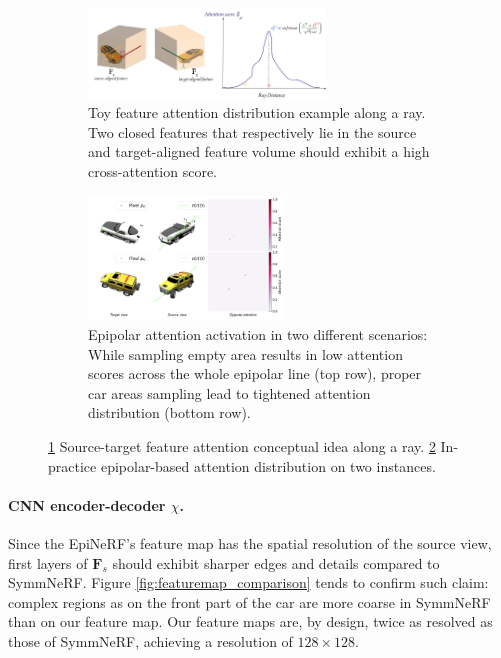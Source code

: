 \begin{figure}[htb!]
  \centering
  \begin{subfigure}[t]{0.48\linewidth}
    \includegraphics[height=2.4cm]{images/epinerf/attention_illustration.png}
    \caption{Toy feature attention distribution example along a ray. Two closed features that respectively lie in the source and target-aligned feature volume should exhibit a high cross-attention score.}
    \label{fig:attention-illustration}
  \end{subfigure}
  \hfill
  \begin{subfigure}[t]{0.48\linewidth}
    \center
    \includegraphics[height=3.3cm]{images/epinerf/exp_epipolar_attention.png}
    \caption{Epipolar attention activation in two different scenarios: While sampling empty area results in low attention scores across the whole epipolar line (top row), proper car areas sampling lead to tightened attention distribution (bottom row).}
    \label{fig:attention-practice}
  \end{subfigure}
  \caption{ \ref{fig:attention-illustration} Source-target feature attention conceptual idea along a ray. \ref{fig:attention-practice} In-practice epipolar-based attention distribution on two instances.}
  \label{fig:attention}
\end{figure}





\paragraph{CNN encoder-decoder $\chi$.}
Since the EpiNeRF's feature map has the spatial resolution of the source view, first layers of $\textbf{F}_{s}$ should exhibit sharper edges and details compared to SymmNeRF. Figure \ref{fig:featuremap_comparison} tends to confirm such claim: complex regions as on the front part of the car are more coarse in SymmNeRF than on our feature map. Our feature maps are, by design, twice as resolved as those of SymmNeRF, achieving a resolution of $128\times128$. 


